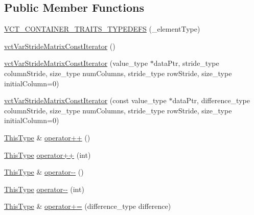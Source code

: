\subsection*{Public Member Functions}
\begin{DoxyCompactItemize}
\item 
\hyperlink{classvct_var_stride_matrix_const_iterator_ae641d8eb3054ff8286514aa4368e9896}{V\-C\-T\-\_\-\-C\-O\-N\-T\-A\-I\-N\-E\-R\-\_\-\-T\-R\-A\-I\-T\-S\-\_\-\-T\-Y\-P\-E\-D\-E\-F\-S} (\-\_\-element\-Type)
\item 
\hyperlink{classvct_var_stride_matrix_const_iterator_aeec91af28c895d8db3917e1935ccad88}{vct\-Var\-Stride\-Matrix\-Const\-Iterator} ()
\item 
\hyperlink{classvct_var_stride_matrix_const_iterator_a06a15fc7eeec337c0349db6dce3c6090}{vct\-Var\-Stride\-Matrix\-Const\-Iterator} (value\-\_\-type $\ast$data\-Ptr, stride\-\_\-type column\-Stride, size\-\_\-type num\-Columns, stride\-\_\-type row\-Stride, size\-\_\-type initial\-Column=0)
\item 
\hyperlink{classvct_var_stride_matrix_const_iterator_a099589387e8348f9cd6041282ec5749d}{vct\-Var\-Stride\-Matrix\-Const\-Iterator} (const value\-\_\-type $\ast$data\-Ptr, difference\-\_\-type column\-Stride, size\-\_\-type num\-Columns, stride\-\_\-type row\-Stride, size\-\_\-type initial\-Column=0)
\item 
\hyperlink{classvct_var_stride_matrix_const_iterator_af68182ea2024c532e999fd1333cb0c6e}{This\-Type} \& \hyperlink{classvct_var_stride_matrix_const_iterator_a8195f80fce3661707a90e3a46d271d36}{operator++} ()
\item 
\hyperlink{classvct_var_stride_matrix_const_iterator_af68182ea2024c532e999fd1333cb0c6e}{This\-Type} \hyperlink{classvct_var_stride_matrix_const_iterator_a7e9e520774eee7cf41ddc410ce75ec65}{operator++} (int)
\item 
\hyperlink{classvct_var_stride_matrix_const_iterator_af68182ea2024c532e999fd1333cb0c6e}{This\-Type} \& \hyperlink{classvct_var_stride_matrix_const_iterator_ac8bdb396a6c4e985611fb4bb60b9630f}{operator-\/-\/} ()
\item 
\hyperlink{classvct_var_stride_matrix_const_iterator_af68182ea2024c532e999fd1333cb0c6e}{This\-Type} \hyperlink{classvct_var_stride_matrix_const_iterator_ab5769cf560202469d4b944fa57f2d8eb}{operator-\/-\/} (int)
\item 
\hyperlink{classvct_var_stride_matrix_const_iterator_af68182ea2024c532e999fd1333cb0c6e}{This\-Type} \& \hyperlink{classvct_var_stride_matrix_const_iterator_a30256c8817665bd404bf5cf72ce810ac}{operator+=} (difference\-\_\-type difference)

\end{DoxyCompactItemize}
